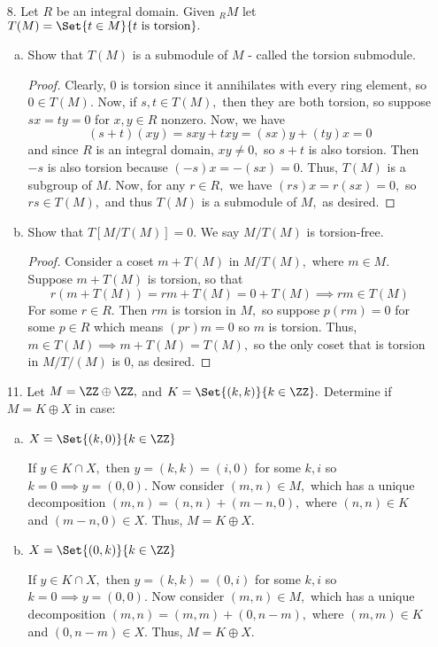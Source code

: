 \documentclass{article}
\begin{document}
\begin{itemize}
	\item[8.] Let $R$ be an integral domain. Given $_R M$ let $T(M)=\Set{t\in M}{t\text{ is torsion}}.$
		\begin{enumerate}[(a)]
			\item Show that $T(M)$ is a submodule of $M$ - called the torsion submodule.
				\begin{proof}
					Clearly, $0$ is torsion since it annihilates with every ring element, so $0\in T(M).$ Now, if $s, t\in T(M),$ then they are both torsion, so suppose $sx=ty=0$ for $x, y\in R$ nonzero. Now, we have
					\[(s+t)(xy) = sxy+txy=(sx)y+(ty)x = 0\]
					and since $R$ is an integral domain, $xy\neq 0,$ so $s+t$ is also torsion. Then $-s$ is also torsion because $(-s)x=-(sx)=0.$ Thus, $T(M)$ is a subgroup of $M.$ Now, for any $r\in R,$ we have $(rs)x=r(sx)=0,$ so $rs\in T(M),$ and thus $T(M)$ is a submodule of $M,$ as desired.
				\end{proof}

				\newpage
			\item Show that $T[M/T(M)]=0.$ We say $M/T(M)$ is torsion-free.
				\begin{proof}
					Consider a coset $m+T(M)$ in $M/T(M),$ where $m\in M.$ Suppose $m+T(M)$ is torsion, so that
					\[r(m+T(M))=rm+T(M)=0+T(M)\implies rm\in T(M)\]
					For some $r\in R.$ Then $rm$ is torsion in $M,$ so suppose $p(rm)=0$ for some $p\in R$ which means $(pr)m=0$ so $m$ is torsion. Thus, $m\in T(M)\implies m+T(M)=T(M),$ so the only coset that is torsion in $M/T/(M)$ is 0, as desired.
				\end{proof}

		\end{enumerate}

	\item[11.] Let $M=\ZZ\oplus\ZZ,$ and $K=\Set{(k, k)}{k\in\ZZ}.$ Determine if $M=K\oplus X$ in case:
		\begin{enumerate}[(a)]
			\item $X=\Set{(k, 0)}{k\in\ZZ}$
				\begin{soln}
					If $y\in K\cap X,$ then $y=(k, k)=(i, 0)$ for some $k, i$ so $k=0\implies y=(0, 0).$ Now consider $(m, n)\in M,$ which has a unique decomposition $(m, n)=(n, n) + (m-n, 0),$ where $(n, n)\in K$ and $(m-n, 0)\in X.$ Thus, $M=K\oplus X.$
				\end{soln}

			\item $X=\Set{(0, k)}{k\in\ZZ}$
				\begin{soln}
					If $y\in K\cap X,$ then $y=(k, k)=(0, i)$ for some $k, i$ so $k=0\implies y=(0, 0).$ Now consider $(m, n)\in M,$ which has a unique decomposition $(m, n)=(m, m) + (0, n-m),$ where $(m, m)\in K$ and $(0, n-m)\in X.$ Thus, $M=K\oplus X.$
				\end{soln}


\end{enumerate}
\end{itemize}
\end{document}
